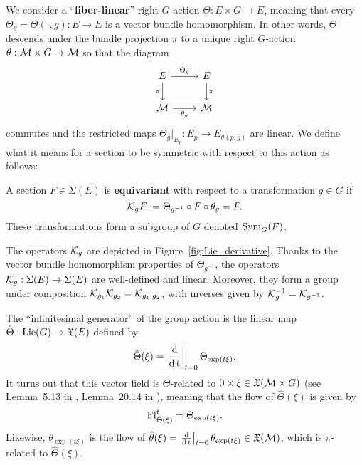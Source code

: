 \documentclass[twoside,11pt]{article}
\begin{document}
We consider a ``\textbf{fiber-linear}'' right $G$-action $\Theta : E \times G \to E$, meaning that every $\Theta_g = \Theta(\cdot, g):E \to E$ is a vector bundle homomorphism.
In other words, $\Theta$ descends under the bundle projection $\pi$ to a unique right $G$-action $\theta : {\mathcal{M}} \times G \to {\mathcal{M}}$ so that the diagram
\begin{equation}
    \begin{tikzcd}
        E \arrow[r, "\Theta_g"] \arrow[d, "\pi"'] & E \arrow[d, "\pi"] \\ %
        \mcal{M} \arrow[r, "\theta_g"'] & \mcal{M}
    \end{tikzcd}
    \label{cd:action_by_vb_homomorphisms}
\end{equation}
commutes and the restricted maps $\Theta_g\vert_{E_p}: E_p \to E_{\theta(p,g)}$ are linear.
We define what it means for a section to be symmetric with respect to this action as follows:
\begin{definition}
    \label{def:equivariance_of_section}
    A section $F\in\Sigma(E)$ is \textbf{equivariant} with respect to a transformation $g\in G$ if
    \begin{equation}
        {\mathcal{K}}_g F := \Theta_{g^{-1}} \circ F \circ \theta_{g} = F.
        \label{eqn:transformation_operators_vb}
    \end{equation}
    These transformations form a subgroup of $G$ denoted $\operatorname{Sym}_G(F)$.
\end{definition}
The operators ${\mathcal{K}}_{g}$ are depicted in Figure~\ref{fig:Lie_derivative}.
Thanks to the vector bundle homomorphism properties of $\Theta_{g^{-1}}$, the operators ${\mathcal{K}}_g: \operatorname{\Sigma}(E) \to \operatorname{\Sigma}(E)$ are well-defined and linear.
Moreover, they form a group under composition ${\mathcal{K}}_{g_1} {\mathcal{K}}_{g_2} = {\mathcal{K}}_{g_1\cdot g_2}$,
with inverses given by ${\mathcal{K}}_g^{-1} = {\mathcal{K}}_{g^{-1}}$.

The ``infinitesimal generator'' of the group action is the linear map $\hat{\Theta}:\operatorname{Lie}(G) \to \mathfrak{X}(E)$ defined by
\begin{equation}
    \hat{\Theta}(\xi) = \left. \operatorname{\frac{\operatorname{\mathrm{d}}}{\operatorname{\mathrm{d}} t}} \right\vert_{t=0} \Theta_{\exp(t\xi)}.
\end{equation}
It turns out that this vector field is $\Theta$-related to $0\times\xi\in\mathfrak{X}({\mathcal{M}}\times G)$ (see Lemma~5.13 in \cite{Kolar1993natural}, Lemma~20.14 in \cite{Lee2013introduction}),
meaning that the flow of $\hat{\Theta}(\xi)$ is given by
\begin{equation}
    \operatorname{Fl}_{\hat{\Theta}(\xi)}^t = \Theta_{\exp(t\xi)}.
    \label{eqn:exp_action_and_flow_on_vb}
\end{equation}
Likewise, $\theta_{\exp(t\xi)}$ is the flow of $\hat{\theta}(\xi) = \left. \operatorname{\frac{\operatorname{\mathrm{d}}}{\operatorname{\mathrm{d}} t}} \right\vert_{t=0} \theta_{\exp(t\xi)} \in \mathfrak{X}({\mathcal{M}})$, which is $\pi$-related to $\hat{\Theta}(\xi)$.
\end{document}

